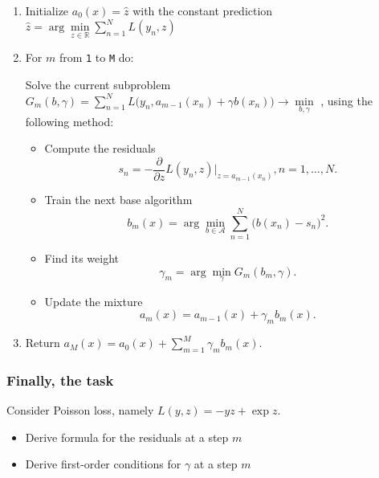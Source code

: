 \documentclass{article}
\begin{document}
\begin{enumerate}
    \item Initialize $a_0(x) = \hat{z}$ with the constant prediction
$   \hat{z} = \arg\min\limits_{z \in \mathbb{R}} \sum_{n=1}^N L(y_n, z)$

    \item For $m$ from \texttt{1} to \texttt{M} do:


Solve the current subproblem
    $G_m(b, \gamma) = \sum_{n=1}^N L\bigl(y_n, a_{m-1}(x_n) + \gamma b(x_n)\bigr) \to \min\limits_{b, \gamma}$
, using the following method:
\begin{itemize}
    \item Compute the residuals
    \begin{equation}
        s_n = - \frac{\partial}{\partial z} L(y_n, z) \Big\vert_{z=a_{m-1}(x_n)}, n = 1,\dots, N.
    \end{equation}

    \item Train the next base algorithm
    \begin{equation}
        b_m(x) = \arg\min\limits_{b\in\mathcal{A}}\sum_{n=1}^N \bigl(b(x_n) - s_n\bigr)^2.
    \end{equation}

    \item Find its weight
    \begin{equation}
         \gamma_m = \arg\min_\gamma G_m(b_m, \gamma).
    \end{equation}

    \item Update the mixture
    \begin{equation}
        a_m(x) = a_{m-1}(x) + \gamma_m b_m(x).
    \end{equation}
\end{itemize}

    \item Return  $a_M(x) = a_0(x) + \sum_{m=1}^M \gamma_m b_m(x)$.

\end{enumerate}

\subsubsection*{Finally, the task}
Consider Poisson loss, namely $L(y, z) = - yz + \exp{z}$.

\begin{itemize}
    \item Derive formula for the residuals at a step $m$
    \item Derive first-order conditions for $\gamma$ at a step $m$
\end{itemize}
\end{document}

